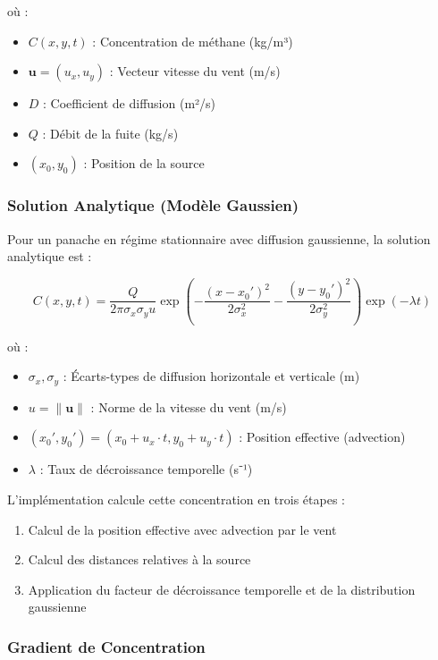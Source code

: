 \documentclass[12pt,a4paper]{article}
\begin{document}
où :
\begin{itemize}
    \item $C(x,y,t)$ : Concentration de méthane (kg/m³)
    \item $\mathbf{u} = (u_x, u_y)$ : Vecteur vitesse du vent (m/s)
    \item $D$ : Coefficient de diffusion (m²/s)
    \item $Q$ : Débit de la fuite (kg/s)
    \item $(x_0, y_0)$ : Position de la source
\end{itemize}

\subsubsection{Solution Analytique (Modèle Gaussien)}

Pour un panache en régime stationnaire avec diffusion gaussienne, la solution analytique est :

\begin{equation}
C(x,y,t) = \frac{Q}{2\pi \sigma_x \sigma_y u} \exp\left(-\frac{(x-x_0')^2}{2\sigma_x^2} - \frac{(y-y_0')^2}{2\sigma_y^2}\right) \exp(-\lambda t)
\end{equation}

où :
\begin{itemize}
    \item $\sigma_x, \sigma_y$ : Écarts-types de diffusion horizontale et verticale (m)
    \item $u = \|\mathbf{u}\|$ : Norme de la vitesse du vent (m/s)
    \item $(x_0', y_0') = (x_0 + u_x \cdot t, y_0 + u_y \cdot t)$ : Position effective (advection)
    \item $\lambda$ : Taux de décroissance temporelle (s⁻¹)
\end{itemize}

L'implémentation calcule cette concentration en trois étapes :
\begin{enumerate}
    \item Calcul de la position effective avec advection par le vent
    \item Calcul des distances relatives à la source
    \item Application du facteur de décroissance temporelle et de la distribution gaussienne
\end{enumerate}

\subsubsection{Gradient de Concentration}
\end{document}
